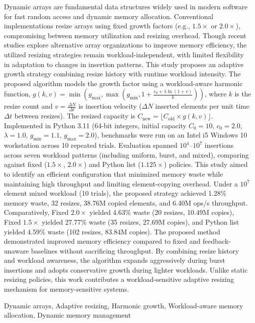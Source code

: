 Dynamic arrays are fundamental data structures widely used in modern software for fast random access and dynamic memory allocation. Conventional implementations resize arrays using fixed growth factors (e.g., $1.5\times$ or $2.0\times$), compromising between memory utilization and resizing overhead. Though recent studies explore alternative array organizations to improve memory efficiency, the utilized resizing strategies remain workload-independent, with limited flexibility in adaptation to changes in insertion patterns. This study proposes an adaptive growth strategy combining resize history with runtime workload intensity. The proposed algorithm models the growth factor using a workload-aware harmonic function, $g(k,v) = \min(g_{\max}, \max(g_{\min}, 1 + \frac{c_0 + \lambda \ln(1+v)}{k}))$, where $k$ is the resize count and $v = \frac{\Delta N}{\Delta t}$ is insertion velocity ($\Delta N$ inserted elements per unit time $\Delta t$ between resizes). The resized capacity is $C_{\text{new}} = \lfloor C_{\text{old}} \times g(k,v) \rfloor$. Implemented in Python 3.11 (64-bit integers, initial capacity $C_0 = 10$, $c_0 = 2.0$, $\lambda = 1.0$, $g_{\min} = 1.1$, $g_{\max} = 2.0$), benchmarks were run on an Intel i5 Windows 10 workstation across 10 repeated trials. Evaluation spanned $10^4$--$10^7$ insertions across seven workload patterns (including uniform, burst, and mixed), comparing against fixed ($1.5\times$, $2.0\times$) and Python list ($1.125\times$) policies. This study aimed to identify an efficient configuration that minimized memory waste while maintaining high throughput and limiting element-copying overhead. Under a $10^7$ element mixed workload (10 trials), the proposed strategy achieved 1.28\% memory waste, 32 resizes, 38.76M copied elements, and 6.40M ops/s throughput. Comparatively, Fixed $2.0\times$ yielded 4.63\% waste (20 resizes, 10.49M copies), Fixed $1.5\times$ yielded 27.77\% waste (35 resizes, 27.69M copies), and Python list yielded 4.59\% waste (102 resizes, 83.84M copies). The proposed method demonstrated improved memory efficiency compared to fixed and feedback-unaware baselines without sacrificing throughput. By combining resize history and workload awareness, the algorithm expands aggressively during burst insertions and adopts conservative growth during lighter workloads. Unlike static resizing policies, this work contributes a workload-sensitive adaptive resizing mechanism for memory-sensitive systems.

\vspace{0.8cm}

 Dynamic arrays, Adaptive resizing, Harmonic growth, Workload-aware memory allocation, Dynamic memory management
